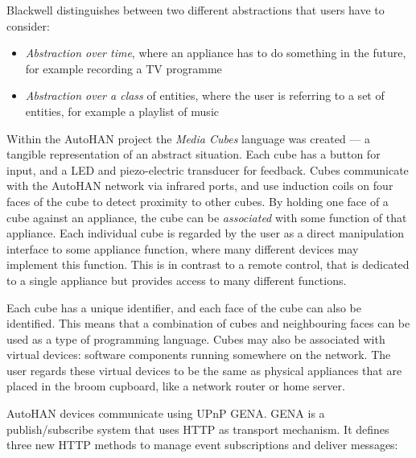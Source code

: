 Blackwell distinguishes between two different abstractions that users have to consider:
\begin{itemize}
	\item \emph{Abstraction over time}, where an appliance has to do something in the future, for example recording a TV programme
	\item \emph{Abstraction over a class} of entities, where the user is referring to a set of entities, for example a playlist of music
\end{itemize}


Within the AutoHAN project the \emph{Media Cubes} language was created --- a tangible representation of an abstract situation. Each cube has a button for input, and a LED and piezo-electric transducer for feedback. Cubes communicate with the AutoHAN network via infrared ports, and use induction coils on four faces of the cube to detect proximity to other cubes. By holding one face of a cube against an appliance, the cube can be \emph{associated} with some function of that appliance. Each individual cube is regarded by the user as a direct manipulation interface to some appliance function, where many different devices may implement this function. This is in contrast to a remote control, that is dedicated to a single appliance but provides access to many different functions. 

Each cube has a unique identifier, and each face of the cube can also be identified. This means that a combination of cubes and neighbouring faces can be used as a type of programming language. Cubes may also be associated with virtual devices: software components running somewhere on the network. The user regards these virtual devices to be the same as physical appliances that are placed in the broom cupboard, like a network router or home server.

AutoHAN devices communicate using \ac{UPnP} \ac{GENA}. \ac{GENA} is a publish/subscribe system that uses HTTP as transport mechanism. It defines three new HTTP methods to manage event subscriptions and deliver messages:

